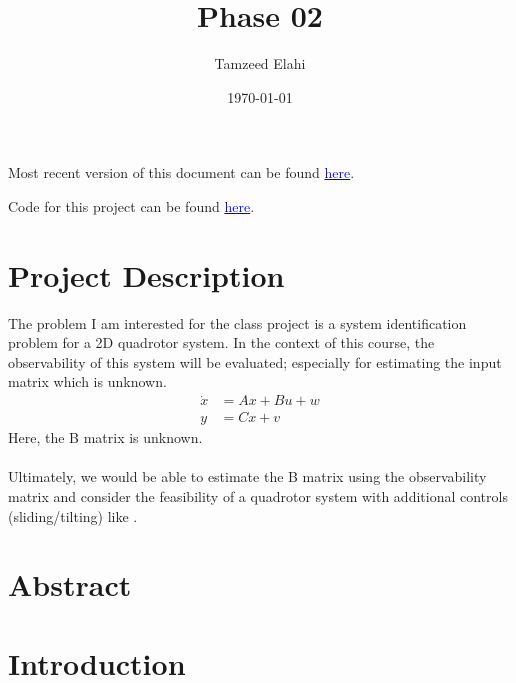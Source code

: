 \documentclass[12pt]{article}
\title{Phase 02}
\author{Tamzeed Elahi}
\date{\today}
\begin{document}
\maketitle

Most recent version of this document can be found \href{https://github.com/tamzeed-toha/Nonlinear_and_Data_Driven_Estimation/blob/main/write_ups/phase_02.pdf}{\textcolor{blue}{here}}. 

Code for this project can be found \href{https://github.com/tamzeed-toha/Nonlinear_and_Data_Driven_Estimation/blob/main/project/phase_02.ipynb}{\textcolor{blue}{here}}.

\section*{Project Description}
The problem I am interested for the class project is a system identification problem for a 2D quadrotor system. In the context of this course, the observability of this system will be evaluated; especially for estimating the input matrix which is unknown. 
\begin{align*}
    \dot{x} &= Ax + Bu + w \\
    y &= Cx + v
\end{align*} 
Here, the B matrix is unknown. \\\\
Ultimately, we would be able to estimate the B matrix using the observability matrix and consider the feasibility of a quadrotor system with additional controls (sliding/tilting) like \cite{Nemati2014}. 

\section*{Abstract}



\section*{Introduction}
\end{document}
